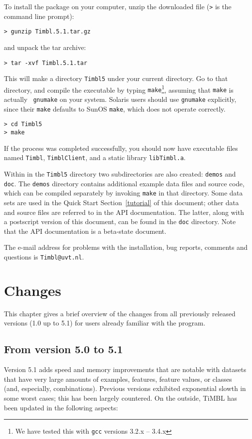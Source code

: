 \documentclass{report}
\begin{document}
To install the package on your computer, unzip the downloaded file
({\tt >} is the command line prompt):

{\tt > gunzip Timbl.5.1.tar.gz}

and unpack the tar archive:

{\tt > tar -xvf Timbl.5.1.tar}

This will make a directory {\tt Timbl5} under your current
directory. Go to that directory, and compile the executable by typing
{\tt make}\footnote{We have tested this with {\tt gcc} versions
3.2.x -- 3.4.x}, assuming that {\tt make} is actually {\tt
gnumake} on your system.  Solaris users should use {\tt gnumake}
explicitly, since their {\tt make} defaults to SunOS {\tt make}, which
does not operate correctly.

{\tt > cd Timbl5} \\
{\tt > make}

If the process was completed successfully, you should now have
executable files named {\tt Timbl}, {\tt TimblClient}, and a
static library {\tt libTimbl.a}.

Within in the {\tt Timbl5} directory two subdirectories are also
created: {\tt demos} and {\tt doc}. The {\tt demos} directory contains
additional example data files and source code, which can be compiled
separately by invoking {\tt make} in that directory. Some data sets
are used in the Quick Start Section~\ref{tutorial} of this document;
other data and source files are referred to in the API
documentation. The latter, along with a postscript version of this
document, can be found in the {\tt doc} directory. Note that the API
documentation is a beta-state document.

The e-mail address for problems with the installation, bug reports,
comments and questions is {\tt Timbl@uvt.nl}.

\chapter{Changes}
\label{changes}

This chapter gives a brief overview of the changes from all previously
released versions (1.0 up to 5.1) for users already familiar with the
program.

\section{From version 5.0 to 5.1}

Version 5.1 adds speed and memory improvements that are notable with
datasets that have very large amounts of examples, features, feature
values, or classes (and, especially, combinations). Previous
versions exhibited exponential slowth in some worst cases; this has
been largely countered. On the outside, TiMBL has been updated in the
following aspects:
\end{document}
